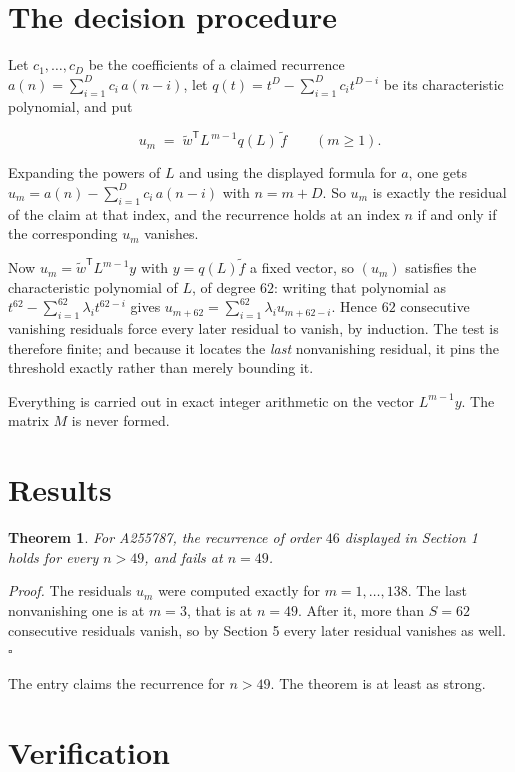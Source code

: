 \documentclass[11pt]{article}
\newtheorem{theorem}{Theorem}
\theoremstyle{definition}
\begin{document}
\section{The decision procedure}

Let $c_1,\dots,c_D$ be the coefficients of a claimed recurrence $a(n) = \sum_{i=1}^{D} c_i\,a(n-i)$, let $q(t) = t^{D} - \sum_{i=1}^{D} c_i t^{D-i}$ be its characteristic polynomial, and put

\[u_m \;=\; \tilde w^{\mathsf T} L^{\,m-1} q(L)\,\tilde f \qquad (m \ge 1).\]

Expanding the powers of $L$ and using the displayed formula for $a$, one gets $u_m = a(n) - \sum_{i=1}^{D} c_i\,a(n-i)$ with $n = m + D$. So $u_m$ is exactly the residual of the claim at that index, and the recurrence holds at an index $n$ if and only if the corresponding $u_m$ vanishes.

Now $u_m = \tilde w^{\mathsf T} L^{m-1} y$ with $y = q(L)\tilde f$ a fixed vector, so $(u_m)$ satisfies the characteristic polynomial of $L$, of degree $62$: writing that polynomial as $t^{62} - \sum_{i=1}^{62} \lambda_i t^{62-i}$ gives $u_{m+62} = \sum_{i=1}^{62} \lambda_i u_{m+62-i}$. Hence $62$ consecutive vanishing residuals force every later residual to vanish, by induction. The test is therefore finite; and because it locates the {\itshape last} nonvanishing residual, it pins the threshold exactly rather than merely bounding it.

Everything is carried out in exact integer arithmetic on the vector $L^{m-1}y$. The matrix $M$ is never formed.

\section{Results}

\begin{theorem} For A255787, the recurrence of order $46$ displayed in Section 1 holds for every $n > 49$, and fails at $n = 49$.\end{theorem}

{\itshape Proof.} The residuals $u_m$ were computed exactly for $m = 1,\dots,138$. The last nonvanishing one is at $m = 3$, that is at $n = 49$. After it, more than $S = 62$ consecutive residuals vanish, so by Section 5 every later residual vanishes as well. $\square$

The entry claims the recurrence for $n > 49$. The theorem is at least as strong.

\section{Verification}
\end{document}
